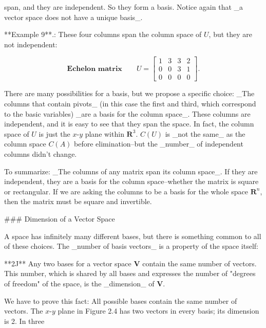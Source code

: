 span, and they are independent. So they form a basis. Notice again that _a vector space does not have a unique basis_.

**Example 9**.: These four columns span the column space of \(U\), but they are not independent:

\[\textbf{Echelon matrix}\qquad U=\begin{bmatrix}1&3&3&2\\ 0&0&3&1\\ 0&0&0&0\end{bmatrix}.\]

There are many possibilities for a basis, but we propose a specific choice: _The columns that contain pivots_ (in this case the first and third, which correspond to the basic variables) _are a basis for the column space_. These columns are independent, and it is easy to see that they span the space. In fact, the column space of \(U\) is just the \(x\)-\(y\) plane within \(\mathbf{R}^{3}\). \(C(U)\) is _not the same_ as the column space \(C(A)\) before elimination--but the _number_ of independent columns didn't change.

To summarize: _The columns of any matrix span its column space_. If they are independent, they are a basis for the column space--whether the matrix is square or rectangular. If we are asking the columns to be a basis for the whole space \(\mathbf{R}^{n}\), then the matrix must be square and invertible.

### Dimension of a Vector Space

A space has infinitely many different bases, but there is something common to all of these choices. The _number of basis vectors_ is a property of the space itself:

**2J** Any two bases for a vector space \(\mathbf{V}\) contain the same number of vectors. This number, which is shared by all bases and expresses the number of "degrees of freedom" of the space, is the _dimension_ of \(\mathbf{V}\).

We have to prove this fact: All possible bases contain the same number of vectors. The \(x\)-\(y\) plane in Figure 2.4 has two vectors in every basis; its dimension is 2. In three 